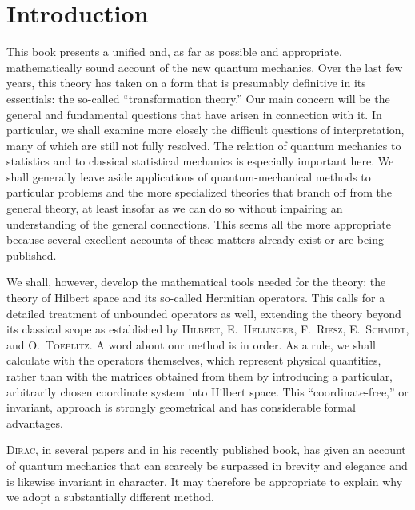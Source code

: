 \documentclass[fontsize=13pt,twoside,openany,headings=normal,parskip=false,bookmarkpackage=false,DIV=calc]{scrbook}
\begin{document}
\chapter*{Introduction}\label{chap:introduction}
\hypertarget{origpage-1}{}%
This book presents a unified and, as far as possible and appropriate, mathematically sound account of the new quantum mechanics. Over the last few years, this theory has taken on a form that is presumably definitive in its essentials: the so-called ``transformation theory.'' Our main concern will be the general and fundamental questions that have arisen in connection with it. In particular, we shall examine more closely the difficult questions of interpretation, many of which are still not fully resolved. The relation of quantum mechanics to statistics and to classical statistical mechanics is especially important here. We shall generally leave aside applications of quantum-mechanical methods to particular problems and the more specialized theories that branch off from the general theory, at least insofar as we can do so without impairing an understanding of the general connections. This seems all the more appropriate because several excellent accounts of these matters already exist or are being published.

We shall, however, develop the mathematical tools needed for the theory: the theory of Hilbert space and its so-called Hermitian operators. This calls for a detailed treatment of unbounded operators as well, extending the theory beyond its classical scope as established by \textsc{Hilbert}, E.~\textsc{Hellinger}, F.~\textsc{Riesz}, E.~\textsc{Schmidt}, and O.~\textsc{Toeplitz}. A word about our method is in order. As a rule, we shall calculate with the operators themselves, which represent physical quantities, rather than with the matrices obtained from them by introducing a particular, arbitrarily chosen coordinate system into Hilbert space. This ``coordinate-free,'' or invariant, approach is strongly geometrical and has considerable formal advantages.

\textsc{Dirac}, in several papers and in his recently published book, has given an account of quantum mechanics that can scarcely be surpassed in brevity and elegance and is likewise invariant in character.
\hypertarget{origpage-2}{}%
It may therefore be appropriate to explain why we adopt a substantially different method.
\end{document}

